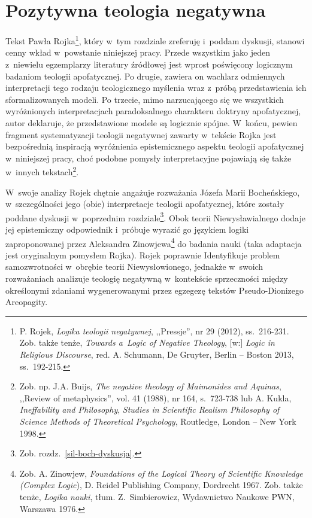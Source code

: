 \chapter{Pozytywna teologia negatywna}\label{sil-pozytywna}






Tekst Pawła Rojka\footnote{ P. Rojek, \textit{Logika teologii negatywnej}, ,,Pressje'', nr 29 (2012), ss.~216-231. Zob. także tenże, \textit{Towards a~Logic of Negative Theology}, [w:] \textit{Logic in Religious Discourse}, red. A. Schumann, De Gruyter, Berlin -- Boston 2013, ss.~192-215.}, który w~tym rozdziale zreferuję i~poddam dyskusji, stanowi cenny wkład w~powstanie niniejszej pracy. Przede wszystkim jako jeden z~niewielu egzemplarzy literatury źródłowej jest wprost poświęcony logicznym badaniom teologii apofatycznej. Po drugie, zawiera on wachlarz odmiennych interpretacji tego rodzaju teologicznego myślenia wraz z~próbą przedstawienia ich sformalizowanych modeli. Po trzecie, mimo narzucającego się we wszystkich wyróżnionych interpretacjach paradoksalnego charakteru doktryny apofatycznej, autor deklaruje, że przedstawione modele są logicznie spójne. W~końcu, pewien fragment systematyzacji teologii negatywnej zawarty w~tekście Rojka jest bezpośrednią inspiracją wyróżnienia epistemicznego aspektu teologii apofatycznej w~niniejszej pracy, choć podobne pomysły interpretacyjne pojawiają się także w~innych tekstach\footnote{ Zob. np. J.A. Buijs, \textit{The negative theology of Maimonides and Aquinas}, ,,Review of metaphysics'', vol. 41 (1988), nr 164, s.~723-738 lub A. Kukla, \textit{Ineffability and Philosophy}, \textit{Studies in Scientific Realism Philosophy of Science Methods of Theoretical Psychology}, Routledge, London -- New York 1998.}.

W~swoje analizy Rojek chętnie angażuje rozważania Józefa Marii Bocheńskiego, w~szczególności jego (obie) interpretacje teologii apofatycznej, które zostały poddane dyskusji w~poprzednim rozdziale\footnote{ Zob. rozdz.~\ref{sil-boch-dyskusja}.}. Obok teorii Niewysławialnego dodaje jej epistemiczny odpowiednik i~próbuje wyrazić go językiem logiki zaproponowanej przez Aleksandra Zinowjewa\footnote{ Zob. A. Zinowjew, \textit{Foundations of the Logical Theory of Scientific Knowledge (Complex Logic}), D. Reidel Publishing Company, Dordrecht 1967. Zob. także tenże, \textit{Logika nauki}, tłum. Z.~Simbierowicz, Wydawnictwo Naukowe PWN, Warszawa 1976.} do badania nauki (taka adaptacja jest oryginalnym pomysłem Rojka). Rojek poprawnie Identyfikuje problem samozwrotności w~obrębie teorii Niewysłowionego, jednakże w~swoich rozważaniach analizuje teologię negatywną w~kontekście sprzeczności między określonymi zdaniami wygenerowanymi przez egzegezę tekstów Pseudo-Dionizego Areopagity.

